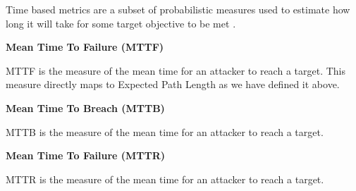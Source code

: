 Time based metrics are a subset of probabilistic measures used to estimate how long it will take for some target objective to be met \cite{Dacier_Deswarte_Kaaniche}\cite{Ortalo_1999}\cite{McQueen_Boyer_Flynn_Beitel_2006}. 

\textbf{Mean Time To Failure (MTTF)} 

MTTF is the measure of the mean time for an attacker to reach a target. This measure directly maps to Expected Path Length as we have defined it above. 

\textbf{Mean Time To Breach (MTTB)} 

MTTB is the measure of the mean time for an attacker to reach a target. 

\textbf{Mean Time To Failure (MTTR)} 

MTTR is the measure of the mean time for an attacker to reach a target. 